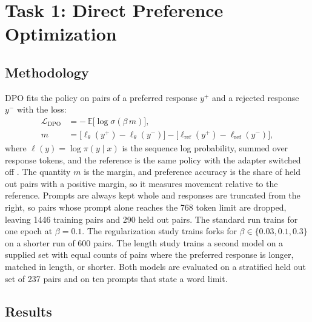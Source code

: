 \documentclass{article}
\begin{document}
\section{Task 1: Direct Preference Optimization}
\label{sec:task1}

\subsection{Methodology}

DPO fits the policy on pairs of a preferred response $y^{+}$ and a rejected
response $y^{-}$ with the loss:
\begin{equation}
\begin{aligned}
  \mathcal{L}_{\text{DPO}} &= -\,\mathbb{E}\big[\log\sigma(\beta\, m)\big],\\
  m &= \big[\ell_\theta(y^{+})-\ell_\theta(y^{-})\big]-\big[\ell_{\text{ref}}(y^{+})-\ell_{\text{ref}}(y^{-})\big],
\end{aligned}
  \label{eq:dpo}
\end{equation}
where $\ell(y)=\log\pi(y\mid x)$ is the sequence log probability, summed over
response tokens, and the reference is the same policy with the adapter
switched off \citep{rafailov2023direct}. The quantity $m$ is the margin, and
preference accuracy is the share of held out pairs with a positive margin, so
it measures movement relative to the reference. Prompts are always kept whole and
responses are truncated from the right, so pairs whose prompt alone reaches the
768 token limit are dropped, leaving 1446 training pairs and 290 held out pairs. The standard run trains for one epoch at $\beta=0.1$. The
regularization study trains forks for $\beta\in\{0.03,0.1,0.3\}$ on a shorter
run of 600 pairs. The length study trains a second model on a supplied set
with equal counts of pairs where the preferred response is longer, matched in
length, or shorter. Both models are evaluated on a stratified held out set of
237 pairs and on ten prompts that state a word limit.

\subsection{Results}
\end{document}
